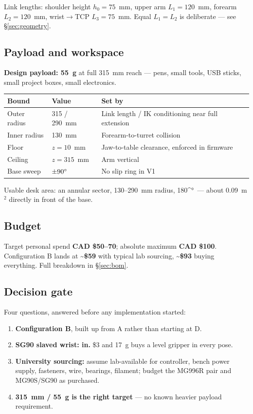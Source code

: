 \documentclass[11pt]{article}
\newcommand{\degsym}{\ifmmode{}^{\circ}\else°\fi}
\begin{document}
Link lengths: shoulder height $h_0=75$~mm, upper arm $L_1=120$~mm, forearm $L_2=120$~mm, wrist$\to$TCP $L_3=75$~mm. Equal $L_1=L_2$ is deliberate --- see \S\ref{sec:geometry}.

\subsection{Payload and workspace}
\textbf{Design payload: 55~g} at full 315~mm reach --- pens, small tools, USB sticks, small project boxes, small electronics.

\begin{center}
\begin{tabular}{L{2.6cm}L{2.6cm}L{9.6cm}}
\toprule
\textbf{Bound} & \textbf{Value} & \textbf{Set by} \\
\midrule
Outer radius & 315 / 290~mm & Link length / IK conditioning near full extension \\
Inner radius & 130~mm & Forearm-to-turret collision \\
Floor & $z=10$~mm & Jaw-to-table clearance, enforced in firmware \\
Ceiling & $z=315$~mm & Arm vertical \\
Base sweep & $\pm90\degsym$ & No slip ring in V1 \\
\bottomrule
\end{tabular}
\end{center}

Usable desk area: an annular sector, 130--290~mm radius, 180\degsym\ --- about 0.09~m$^2$ directly in front of the base.

\subsection{Budget}
Target personal spend \textbf{CAD \$50--70}; absolute maximum \textbf{CAD \$100}. Configuration B lands at \textbf{\textasciitilde\$59} with typical lab sourcing, \textbf{\textasciitilde\$93} buying everything. Full breakdown in \S\ref{sec:bom}.

\subsection{Decision gate}
Four questions, answered before any implementation started:
\begin{enumerate}
\item \textbf{Configuration B}, built up from A rather than starting at D.
\item \textbf{SG90 slaved wrist: in.} \$3 and 17~g buys a level gripper in every pose.
\item \textbf{University sourcing:} assume lab-available for controller, bench power supply, fasteners, wire, bearings, filament; budget the MG996R pair and MG90S/SG90 as purchased.
\item \textbf{315~mm / 55~g is the right target} --- no known heavier payload requirement.
\end{enumerate}
\end{document}
